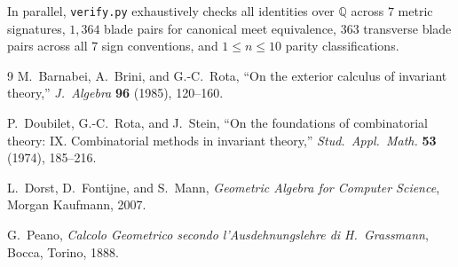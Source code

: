 \documentclass[11pt]{article}
\theoremstyle{definition}
\newcommand{\Q}{\mathbb{Q}}
\begin{document}
In parallel, \texttt{verify.py} exhaustively checks all identities over $\Q$ across $7$ metric signatures, $1{,}364$ blade pairs for canonical meet equivalence, $363$ transverse blade pairs across all $7$ sign conventions, and $1 \le n \le 10$ parity classifications.

\begin{thebibliography}{9}
M.~Barnabei, A.~Brini, and G.-C.~Rota, ``On the exterior calculus of invariant theory,'' \emph{J.~Algebra} \textbf{96} (1985), 120--160.

P.~Doubilet, G.-C.~Rota, and J.~Stein, ``On the foundations of combinatorial theory: IX. Combinatorial methods in invariant theory,'' \emph{Stud.\ Appl.\ Math.} \textbf{53} (1974), 185--216.

L.~Dorst, D.~Fontijne, and S.~Mann, \emph{Geometric Algebra for Computer Science}, Morgan Kaufmann, 2007.

G.~Peano, \emph{Calcolo Geometrico secondo l'Ausdehnungslehre di H.~Grassmann}, Bocca, Torino, 1888.
\end{thebibliography}
\end{document}
